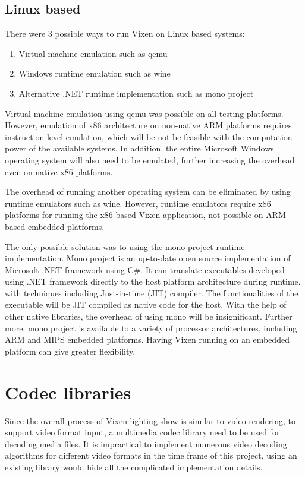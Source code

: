 \subsection{Linux based}

There were 3 possible ways to run Vixen on Linux based systems:

\begin{enumerate}
  \item Virtual machine emulation such as qemu \cite{qemu}
  \item Windows runtime emulation such as wine \cite{wine}
  \item Alternative .NET runtime implementation such as mono project \cite{de2004mono}
\end{enumerate}

Virtual machine emulation using qemu was possible on all testing platforms. However, emulation of x86 architecture on non-native ARM platforms requires instruction level emulation, which will be not be feasible with the computation power of the available systems. In addition, the entire Microsoft Windows operating system will also need to be emulated, further increasing the overhead even on native x86 platforms.

The overhead of running another operating system can be eliminated by using runtime emulators such as wine. However, runtime emulators require x86 platforms for running the x86 based Vixen application, not possible on ARM based embedded platforms.

The only possible solution was to using the mono project runtime implementation. Mono project is an up-to-date open source implementation of Microsoft .NET framework using C\#. It can translate executables developed using .NET framework directly to the host platform architecture during runtime, with techniques including Just-in-time (JIT) compiler. The functionalities of the executable will be JIT compiled as native code for the host. With the help of other native libraries, the overhead of using mono will be insignificant. Further more, mono project is available to a variety of processor architectures, including ARM and MIPS embedded platforms. Having Vixen running on an embedded platform can give greater flexibility.

\section{Codec libraries}

Since the overall process of Vixen lighting show is similar to video rendering, to support video format input, a multimedia codec library need to be used for decoding media files. It is impractical to implement numerous video decoding algorithms for different video formats in the time frame of this project, using an existing library would hide all the complicated implementation details.

